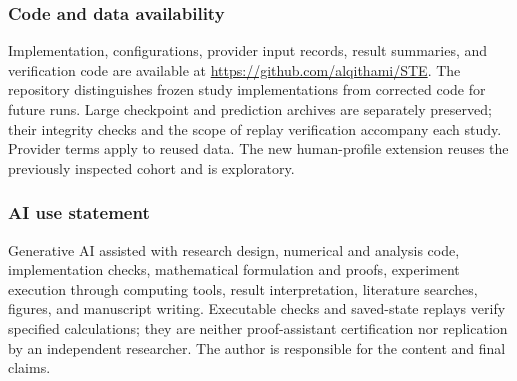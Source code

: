 \subsubsection*{Code and data availability}
Implementation, configurations, provider input records, result summaries, and verification code are available at \url{https://github.com/alqithami/STE}. The repository distinguishes frozen study implementations from corrected code for future runs. Large checkpoint and prediction archives are separately preserved; their integrity checks and the scope of replay verification accompany each study. Provider terms apply to reused data. The new human-profile extension reuses the previously inspected cohort and is exploratory.

\subsubsection*{AI use statement}
Generative AI assisted with research design, numerical and analysis code, implementation checks, mathematical formulation and proofs, experiment execution through computing tools, result interpretation, literature searches, figures, and manuscript writing. Executable checks and saved-state replays verify specified calculations; they are neither proof-assistant certification nor replication by an independent researcher. The author is responsible for the content and final claims.


